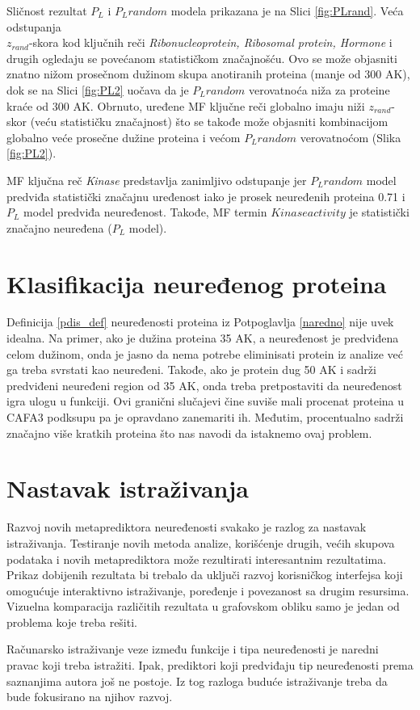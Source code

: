 Sličnost rezultat $P_L$ i $P_L random$ modela prikazana je na Slici
\ref{fig:PLrand}. Veća odstupanja \\$z_{rand}$-skora kod ključnih reči
\textit{Ribonucleoprotein, Ribosomal protein, Hormone} i drugih ogledaju se
povećanom statističkom značajnošću. Ovo se može objasniti znatno
nižom prosečnom dužinom skupa anotiranih proteina (manje od 300 AK), dok se na
Slici \ref{fig:PL2} uočava da je $P_L random$ verovatnoća niža za proteine
kraće od 300 AK.  Obrnuto, uređene MF ključne reči globalno imaju niži
$z_{rand}$-skor (veću statističku značajnost) što se takođe može objasniti
kombinacijom globalno veće prosečne dužine proteina i većom $P_L random$
verovatnoćom (Slika \ref{fig:PL2}). 

MF ključna reč \textit{Kinase} predstavlja zanimljivo odstupanje jer $P_L
random$ model predviđa statistički značajnu uređenost iako je prosek neuređenih
proteina 0.71 i $P_L$ model predviđa neuređenost. Takođe, MF termin $Kinase
activity$ je statistički značajno neuređena ($P_L$ model).

\section{Klasifikacija neuređenog proteina}

Definicija \ref{pdis_def} neuređenosti proteina iz Potpoglavlja
\ref{naredno} nije uvek idealna.  Na primer, ako je dužina proteina 35 AK, a
neuređenost je predviđena celom dužinom, onda je jasno da nema potrebe eliminisati
protein iz analize već ga treba svrstati kao neuređeni.  Takođe, ako je protein
dug 50 AK i sadrži predviđeni neuređeni region od 35 AK, onda treba
pretpostaviti da neuređenost igra ulogu u funkciji. Ovi granični slučajevi čine
suviše mali procenat proteina u CAFA3 podksupu pa je opravdano zanemariti ih.
Međutim, procentualno \swissprot sadrži značajno više kratkih proteina što nas
navodi da istaknemo ovaj problem.

\section{Nastavak istraživanja}

Razvoj novih metaprediktora neuređenosti \cite{Meng_c2017} svakako je razlog za
nastavak istraživanja. Testiranje novih metoda analize, korišćenje drugih,
većih skupova podataka i novih metaprediktora može rezultirati interesantnim
rezultatima. Prikaz dobijenih rezultata bi trebalo da uključi razvoj
korisničkog interfejsa koji omogućuje interaktivno istraživanje, poređenje i
povezanost sa drugim resursima. Vizuelna komparacija različitih rezultata u
grafovskom obliku samo je jedan od problema koje treba rešiti.

Računarsko istraživanje veze između funkcije i tipa neuređenosti je naredni
pravac koji treba istražiti. Ipak, prediktori koji predviđaju tip neuređenosti
prema saznanjima autora još ne postoje. Iz tog razloga buduće istraživanje
treba da bude fokusirano na njihov razvoj.

